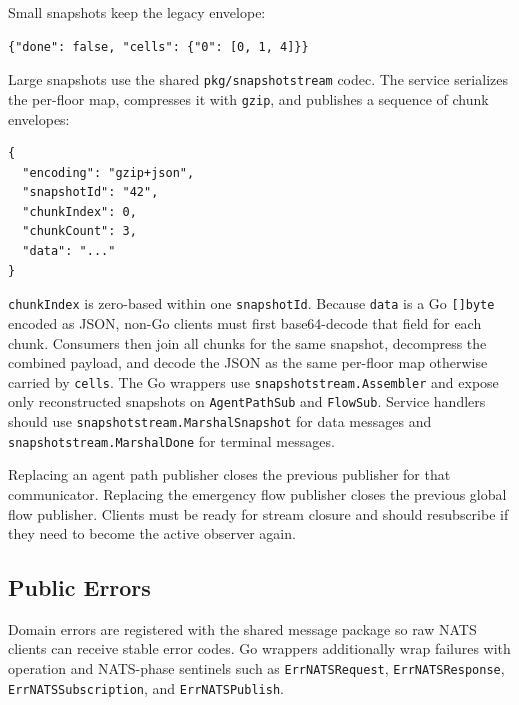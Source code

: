 \documentclass[12pt,a4paper]{report}
\begin{document}
Small snapshots keep the legacy envelope:

\begin{lstlisting}
{"done": false, "cells": {"0": [0, 1, 4]}}
\end{lstlisting}
Large snapshots use the shared \texttt{pkg/snapshotstream} codec. The service
serializes the per-floor map, compresses it with \texttt{gzip}, and publishes a
sequence of chunk envelopes:

\begin{lstlisting}
{
  "encoding": "gzip+json",
  "snapshotId": "42",
  "chunkIndex": 0,
  "chunkCount": 3,
  "data": "..."
}
\end{lstlisting}

\texttt{chunkIndex} is zero-based within one \texttt{snapshotId}. Because
\texttt{data} is a Go \texttt{[]byte} encoded as JSON, non-Go clients must first
base64-decode that field for each chunk. Consumers then join all chunks for the
same snapshot, decompress the combined payload, and decode the JSON as the same
per-floor map otherwise carried by \texttt{cells}. The Go wrappers use
\texttt{snapshotstream.Assembler} and expose only reconstructed snapshots on
\texttt{AgentPathSub} and \texttt{FlowSub}. Service handlers should use
\texttt{snapshotstream.MarshalSnapshot} for data messages and
\texttt{snapshotstream.MarshalDone} for terminal messages.

Replacing an agent path publisher closes the previous publisher for that
communicator. Replacing the emergency flow publisher closes the previous global
flow publisher. Clients must be ready for stream closure and should resubscribe
if they need to become the active observer again.

\subsection{Public Errors}

Domain errors are registered with the shared message package so raw NATS clients
can receive stable error codes. Go wrappers additionally wrap failures with
operation and NATS-phase sentinels such as \texttt{ErrNATSRequest},
\texttt{ErrNATSResponse}, \texttt{ErrNATSSubscription}, and
\texttt{ErrNATSPublish}.
\end{document}
